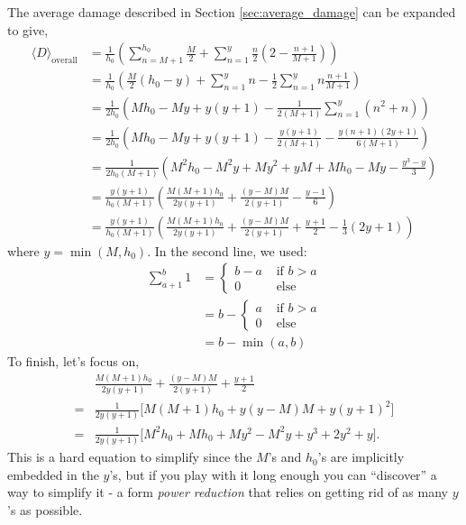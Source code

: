 The average damage described in Section \ref{sec:average_damage} can be expanded to give,
\begin{align}
	\langle D \rangle_\text{overall} &= \frac{1}{h_0}\left(
		\sum_{n=M+1}^{h_{0}}\frac{M}{2} +
		\sum_{n=1}^{y} \frac{n}{2}\left(2 - \frac{n + 1}{M+1}\right)
	\right) \\
	&= \frac{1}{h_0}\left(
		\frac{M}{2}(h_0-y) +
		\sum_{n=1}^{y}n - \frac{1}{2}\sum_{n=1}^yn\frac{n + 1}{M+1}
	\right) \\
	&= \frac{1}{2h_0}\left(
		Mh_0-My + y(y+1)
		 - \frac{1}{2({M+1})}\sum_{n=1}^y(n^2 + n)
	\right) \\
	&= \frac{1}{2h_0}\left(
		Mh_0-My + y(y+1) - \frac{y(y+1)}{2({M+1})}
		 - \frac{y(n+1)(2y+1)}{6({M+1})}
	\right) \\
	&= \frac{1}{2h_0({M+1})}\left(
		M^{2}h_{0}-M^{2}y+My^{2}+yM+Mh_{0}-My - \frac{y^3-y}{3}
	\right) \\
	&= \frac{y(y+1)}{h_0({M+1})}\left(
		\frac{M(M+1)h_{0}}{2y(y+1)}+\frac{(y-M)M}{2(y+1)} - \frac{y-1}{6}
	\right) \\
	&= \frac{y(y+1)}{h_0({M+1})}\left(
		\frac{M(M+1)h_{0}}{2y(y+1)}+\frac{(y-M)M}{2(y+1)} +\frac{y+1}{2} -\frac{1}{3}(2y+1)
	\right)
	\label{eq:app-average-damage-original}
\end{align}
where $y=\min(M, h_0)$. In the second line, we used:
\begin{align}
	\sum_{a+1}^b1&=\begin{cases}
			b-a&\text{ if } b>a\\
			0 &\text{ else }
		\end{cases}\\
		&=b-\begin{cases}
			a &\text{ if } b>a\\
			0 &\text{ else }
		\end{cases}\\
		&=b-\min(a, b)
\end{align}
To finish, let's focus on,
\begin{align}
	 &\frac{M(M+1)h_{0}}{2y(y+1)}+\frac{(y-M)M}{2(y+1)} +\frac{y+1}{2} \\
	=&\frac{1}{2y(y+1)}\Big[ M(M+1)h_{0}+y(y-M)M +y(y+1)^2 \Big]\\
	=&\frac{1}{2y(y+1)}\Big[ M^2h_{0}+Mh_0+My^2-M^2y +y^3+2y^2+y \Big].\label{eq:app-average-damage-bracket}
\end{align}
This is a hard equation to simplify since the $M$'s and $h_0$'s are implicitly embedded in the $y$'s, but if you play with it long enough you can ``discover'' a way to simplify it - a form \textit{power reduction} that relies on getting rid of as many $y$'s as possible.

